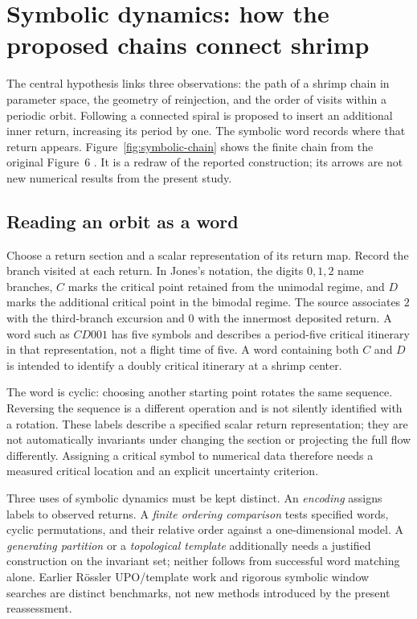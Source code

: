 \section{Symbolic dynamics: how the proposed chains connect shrimp}
\label{sec:mechanism}

The central hypothesis links three observations: the path of a shrimp chain
in parameter space, the geometry of reinjection, and the order of visits
within a periodic orbit. Following a connected spiral is proposed to insert
an additional inner return, increasing its period by one. The symbolic word
records where that return appears. Figure~\ref{fig:symbolic-chain} shows
the finite chain from the original Figure~6
\citep{jones2012topological}. It is a redraw of the reported construction;
its arrows are not new numerical results from the present study.

\subsection{Reading an orbit as a word}

Choose a return section and a scalar representation of its return map.
Record the branch visited at each return. In Jones's notation, the digits
$0,1,2$ name branches, $C$ marks the critical point retained from the
unimodal regime, and $D$ marks the additional critical point in the bimodal
regime. The source associates $2$ with the third-branch excursion and $0$
with the innermost deposited return. A word such as $CD001$ has five
symbols and describes a period-five critical itinerary in that
representation, not a flight time of five. A word containing both $C$ and
$D$ is intended to identify a doubly critical itinerary at a shrimp center.

The word is cyclic: choosing another starting point rotates the same
sequence. Reversing the sequence is a different operation and is not
silently identified with a rotation. These labels describe a specified
scalar return representation; they are not automatically invariants under
changing the section or projecting the full flow differently. Assigning a
critical symbol to numerical data therefore needs a measured critical
location and an explicit uncertainty criterion.

Three uses of symbolic dynamics must be kept distinct. An \emph{encoding}
assigns labels to observed returns. A \emph{finite ordering comparison}
tests specified words, cyclic permutations, and their relative order against
a one-dimensional model. A \emph{generating partition} or a
\emph{topological template} additionally needs a justified construction on
the invariant set; neither follows from successful word matching alone.
Earlier R{\"o}ssler UPO/template work \citep{letellier1995unstable} and
rigorous symbolic window searches \citep{galias2025symbolic} are distinct
benchmarks, not new methods introduced by the present reassessment.

